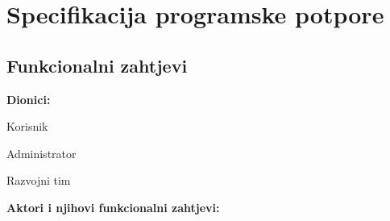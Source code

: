 \chapter{Specifikacija programske potpore}
		
	\section{Funkcionalni zahtjevi}

			\noindent \textbf{Dionici:}
			
			\begin{packed_enum}
				
				\item Korisnik
				\item Administrator				
				\item Razvojni tim
				
			\end{packed_enum}
			
			\noindent \textbf{Aktori i njihovi funkcionalni zahtjevi:}
			
